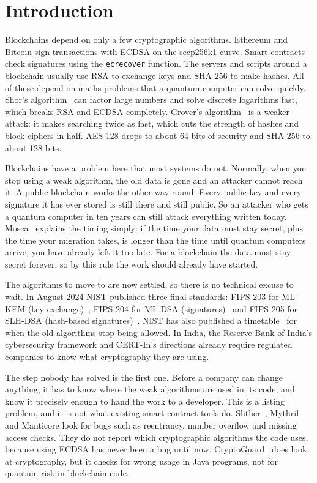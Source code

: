 \documentclass[runningheads]{llncs}
\begin{document}
\section{Introduction}
\label{sec:intro}

Blockchains depend on only a few cryptographic algorithms. Ethereum and Bitcoin
sign transactions with ECDSA on the secp256k1 curve. Smart contracts check
signatures using the \texttt{ecrecover} function. The servers and scripts around
a blockchain usually use RSA to exchange keys and SHA-256 to make hashes. All of
these depend on maths problems that a quantum computer can solve quickly.
Shor's algorithm~\cite{shor1997} can factor large numbers and solve discrete
logarithms fast, which breaks RSA and ECDSA completely. Grover's
algorithm~\cite{grover1996} is a weaker attack: it makes searching twice as
fast, which cuts the strength of hashes and block ciphers in half. AES-128 drops
to about 64 bits of security and SHA-256 to about 128 bits.

Blockchains have a problem here that most systems do not. Normally, when you
stop using a weak algorithm, the old data is gone and an attacker cannot reach
it. A public blockchain works the other way round. Every public key and every
signature it has ever stored is still there and still public. So an attacker who
gets a quantum computer in ten years can still attack everything written today.
Mosca~\cite{mosca2018} explains the timing simply: if the time your data must
stay secret, plus the time your migration takes, is longer than the time until
quantum computers arrive, you have already left it too late. For a blockchain
the data must stay secret forever, so by this rule the work should already have
started.

The algorithms to move to are now settled, so there is no technical excuse to
wait. In August 2024 NIST published three final standards: FIPS 203 for ML-KEM
(key exchange)~\cite{fips203}, FIPS 204 for ML-DSA
(signatures)~\cite{fips204} and FIPS 205 for SLH-DSA (hash-based
signatures)~\cite{fips205}. NIST has also published a timetable~\cite{nistir8547}
for when the old algorithms stop being allowed. In India, the Reserve Bank of
India's cybersecurity framework and CERT-In's directions already require
regulated companies to know what cryptography they are using.

The step nobody has solved is the first one. Before a company can change
anything, it has to know where the weak algorithms are used in its code, and
know it precisely enough to hand the work to a developer. This is a listing
problem, and it is not what existing smart contract tools do.
Slither~\cite{slither}, Mythril and Manticore look for bugs such as reentrancy,
number overflow and missing access checks. They do not report which
cryptographic algorithms the code uses, because using ECDSA has never been a bug
until now. CryptoGuard~\cite{cryptoguard} does look at cryptography, but it
checks for wrong usage in Java programs, not for quantum risk in blockchain
code.
\end{document}
